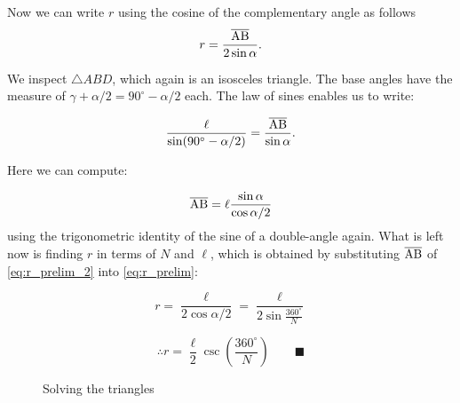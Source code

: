 \documentclass{article}
\begin{document}
Now we can write $r$ using the cosine of the complementary angle as follows
\begin{equation}
\label{eq:r_prelim}
r = \frac{\overline{\rm AB}} {2 \sin \alpha}. \\ 
\end{equation}

We inspect $\triangle ABD$, which again is an isosceles triangle.  The base angles have the measure of $\gamma + \alpha / 2 = 90^\circ - \alpha / 2$ each.  The law of sines enables us to write:

\begin{equation}
    \frac{\ell}{\sin(90^\circ - \alpha / 2)}  = \frac{\overline{\rm AB}}{\sin \alpha}.
\end{equation}

Here we can compute:

\begin{equation}
    \overline{\rm AB} =  \ell \frac{\sin \alpha}{\cos \alpha/2} \\
    \label{eq:r_prelim_2}
\end{equation}%
using the trigonometric identity of the sine of a double-angle again.  What is left now is finding $r$  in terms of $N$ and $\ell$, which is obtained by substituting $\overline{\rm AB}$ of \eqref{eq:r_prelim_2} into \eqref{eq:r_prelim}:

\begin{equation}
r = \frac{\ell}{2\cos \alpha / 2}  = \frac{\ell}{2\sin \frac{360^\circ}{N}}
\end{equation}

\begin{equation}
\therefore r  = \frac{\ell}{2} \csc \left ( \frac{360^\circ}{N} \right ) \qquad \blacksquare
\end{equation}

\begin{figure}[!t]
\centering

\caption{Solving the triangles}\label{fig:star}
\end{figure}
\end{document}
